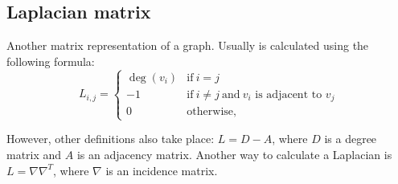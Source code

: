 \subsection{Laplacian matrix}
\begin{frame}{\subsecname}
	Another matrix representation of a graph.
	Usually is calculated using the following formula:
	\begin{equation*}
		L_{i, j} =
		\begin{cases}
			\deg(v_i) & \mbox{if}\ i = j                                                 \\
			-1        & \mbox{if}\ i \neq j\ \mbox{and}\ v_i \mbox{ is adjacent to } v_j \\
			0         & \mbox{otherwise},
		\end{cases}
	\end{equation*}

	However, other definitions also take place: $L = D - A$, where $D$ is a degree matrix and $A$ is an adjacency matrix.
	Another way to calculate a Laplacian is $L = \nabla\nabla^{T}$, where $\nabla$ is an incidence matrix.
\end{frame}

